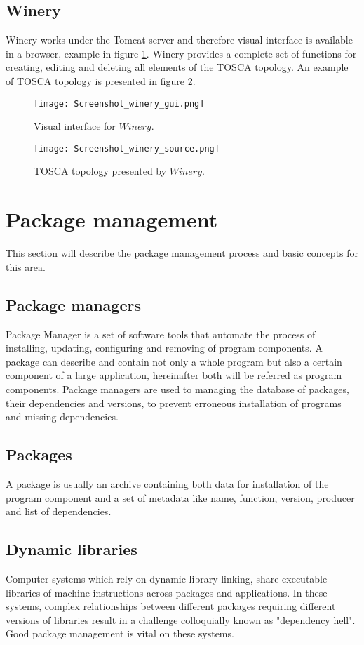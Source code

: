 \subsection*{Winery}\label{subs:wine}\label{tool:winery}
Winery works under the Tomcat server and therefore visual interface is available in a	 browser, example in figure \ref{fig:winery_gui}.
Winery provides a complete set of functions for creating, editing and deleting all elements of the TOSCA topology. 
An example of TOSCA topology is presented in figure \ref{fig:winery_source}.
\begin{figure}[ht]   
	\centering
	\texttt{[image: Screenshot\_winery\_gui.png]}
	\caption{Visual interface for $Winery$.}
	\label{fig:winery_gui}
\end{figure}
\begin{figure}[ht]   
\centering
\texttt{[image: Screenshot\_winery\_source.png]}
\caption{TOSCA topology presented by $Winery$.}
\label{fig:winery_source}
\end{figure}


\section{Package management} \label{sec:pm}
This section will describe the package management process and basic concepts for this area.
\subsection*{Package managers}
Package Manager is a set of software tools that automate the process of installing, updating, configuring and removing of program components.
A package can describe and contain not only a whole program but also a certain component of a large application, hereinafter both will be referred as program components.
Package managers are used to managing the database of packages, their dependencies and versions, to prevent erroneous installation of programs and missing dependencies.
\subsection*{Packages}
A package is usually an archive containing both data for installation of the program component and a set of metadata like name, function, version, producer and list of dependencies.
\subsection*{Dynamic libraries}
Computer systems which rely on dynamic library linking, share executable libraries of machine instructions across packages and applications. 
In these systems, complex relationships between different packages requiring different versions of libraries result in a challenge colloquially known as "dependency hell".
Good package management is vital on these systems.
